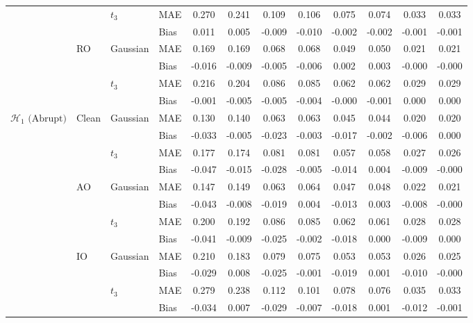 \begin{table}[ht]
{\begin{tabular}{clllcc|cc|cc|cc}
\cmidrule{3-12}
& & \multirow{2}{*}{$t_3$} & MAE & 0.270 & 0.241 & 0.109 & 0.106 & 0.075 & 0.074 & 0.033 & 0.033 \\
& & & Bias & 0.011 & 0.005 & -0.009 & -0.010 & -0.002 & -0.002 & -0.001 & -0.001 \\
\cmidrule{2-12}
& \multirow{4}{*}{RO} & \multirow{2}{*}{Gaussian} & MAE & 0.169 & 0.169 & 0.068 & 0.068 & 0.049 & 0.050 & 0.021 & 0.021 \\
& & & Bias & -0.016 & -0.009 & -0.005 & -0.006 & 0.002 & 0.003 & -0.000 & -0.000 \\
\cmidrule{3-12}
& & \multirow{2}{*}{$t_3$} & MAE & 0.216 & 0.204 & 0.086 & 0.085 & 0.062 & 0.062 & 0.029 & 0.029 \\
& & & Bias & -0.001 & -0.005 & -0.005 & -0.004 & -0.000 & -0.001 & 0.000 & 0.000 \\
\midrule
\multirow{16}{*}{$\mathcal{H}_1 \text{ (Abrupt)}$}
& \multirow{4}{*}{Clean} & \multirow{2}{*}{Gaussian} & MAE & 0.130 & 0.140 & 0.063 & 0.063 & 0.045 & 0.044 & 0.020 & 0.020 \\
& & & Bias & -0.033 & -0.005 & -0.023 & -0.003 & -0.017 & -0.002 & -0.006 & 0.000 \\
\cmidrule{3-12}
& & \multirow{2}{*}{$t_3$} & MAE & 0.177 & 0.174 & 0.081 & 0.081 & 0.057 & 0.058 & 0.027 & 0.026 \\
& & & Bias & -0.047 & -0.015 & -0.028 & -0.005 & -0.014 & 0.004 & -0.009 & -0.000 \\
\cmidrule{2-12}
& \multirow{4}{*}{AO} & \multirow{2}{*}{Gaussian} & MAE & 0.147 & 0.149 & 0.063 & 0.064 & 0.047 & 0.048 & 0.022 & 0.021 \\
& & & Bias & -0.043 & -0.008 & -0.019 & 0.004 & -0.013 & 0.003 & -0.008 & -0.000 \\
\cmidrule{3-12}
& & \multirow{2}{*}{$t_3$} & MAE & 0.200 & 0.192 & 0.086 & 0.085 & 0.062 & 0.061 & 0.028 & 0.028 \\
& & & Bias & -0.041 & -0.009 & -0.025 & -0.002 & -0.018 & 0.000 & -0.009 & 0.000 \\
\cmidrule{2-12}
& \multirow{4}{*}{IO} & \multirow{2}{*}{Gaussian} & MAE & 0.210 & 0.183 & 0.079 & 0.075 & 0.053 & 0.053 & 0.026 & 0.025 \\
& & & Bias & -0.029 & 0.008 & -0.025 & -0.001 & -0.019 & 0.001 & -0.010 & -0.000 \\
\cmidrule{3-12}
& & \multirow{2}{*}{$t_3$} & MAE & 0.279 & 0.238 & 0.112 & 0.101 & 0.078 & 0.076 & 0.035 & 0.033 \\
& & & Bias & -0.034 & 0.007 & -0.029 & -0.007 & -0.018 & 0.001 & -0.012 & -0.001 \\

\end{tabular}}
\end{table}
